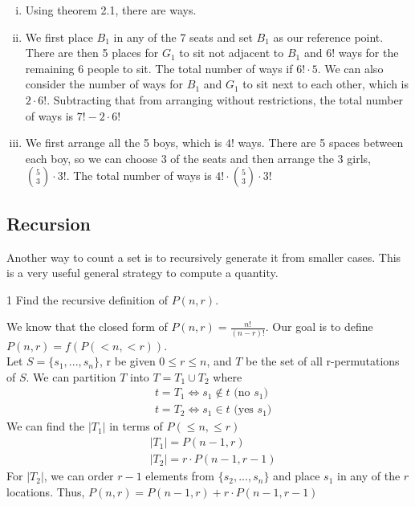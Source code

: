 \begin{solution}
    \begin{enumerate}[(i)]
        \item Using theorem 2.1, there are  ways.
        \item We first place $B_1$ in any of the 7 seats and set $B_1$ as our reference point. There are then 5 places for $G_1$ to sit not adjacent to $B_1$ and 6! ways for the remaining 6 people to sit. The total number of ways if $\boxed{6! \cdot 5}$. We can also consider the number of ways for $B_1$ and $G_1$ to sit next to each other, which is $2 \cdot 6!$. Subtracting that from arranging without restrictions, the total number of ways is $\boxed{7! - 2 \cdot 6!}$ 
        \item We first arrange all the 5 boys, which is $4!$ ways. There are 5 spaces between each boy, so we can choose 3 of the seats and then arrange the 3 girls, $\binom{5}{3} \cdot 3!$. The total number of ways is $\boxed{4! \cdot \binom{5}{3} \cdot 3!}$
    \end{enumerate}
\end{solution}



\subsection{Recursion}
Another way to count a set is to recursively generate it from smaller cases. 
This is a very useful general strategy to compute a quantity. 

\begin{exercise}
    1 Find the recursive definition of $P(n,r)$.
\end{exercise}

\begin{solution}
    We know that the closed form of $P(n,r) = \frac{n!}{(n-r)!}$. Our goal is to define $P(n, r) = f(P(<n, <r))$.\\
    Let $S = \{s_1, ..., s_n\}$, r be given $0 \leq r \leq n$, and $T$ be the set of all r-permutations of $S$.
    \noindent
    We can partition $T$ into $T = T_1 \cup T_2$ where
    \begin{align*}
        &t = T_1 \Leftrightarrow s_1 \notin t \text{ (no $s_1$)}\\
        &t = T_2 \Leftrightarrow s_1 \in t \text{ (yes $s_1$)}
    \end{align*}
    We can find the $|T_1|$ in terms of $P(\leq n, \leq r)$
    \begin{align*}
        &|T_1| = P(n-1, r)\\
        &|T_2| = r \cdot P(n-1, r-1) 
    \end{align*}
    For $|T_2|$, we can order $r-1$ elements from $\{s_2, ..., s_n \}$ and place $s_1$ in any of the $r$ locations. Thus, $\boxed{P(n,r) = P(n-1,r) + r \cdot P(n-1, r-1)}$
\end{solution}

